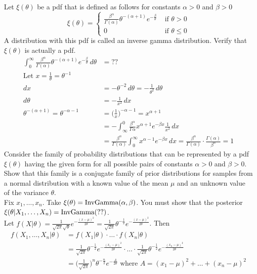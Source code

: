 \documentclass[12pt]{article}
\begin{document}
Let $\xi(\theta)$ be a pdf that is defined as follows for constants $\alpha > 0$ and $\beta > 0$ $$\xi(\theta) = \begin{cases} \frac{\beta^\alpha}{\Gamma(\alpha)} \theta^{-(\alpha + 1)} e^{-\frac{\beta}{\theta}} &\text{ if } \theta > 0 \\ 0 &\text{ if } \theta \leq 0 \end{cases} $$ A distribution with this pdf is called an inverse gamma distribution. Verify that $\xi(\theta)$ is actually a pdf. 
$$ \begin{aligned} \int_0^\infty \frac{\beta^\alpha}{\Gamma(\alpha)} \theta^{-(\alpha + 1)} e^{-\frac{\beta}{\theta}}\, d\theta &= ?? \\ \text{Let } x = \frac{1}{\theta} = \theta^{-1} \\ dx &= -\theta^{-2} \, d\theta = -\frac{1}{\theta^2} \, d\theta \\  d\theta &= -\frac{1}{x^2} \, dx \\ \theta^{-(\alpha + 1)} = \theta^{-\alpha - 1} &= \Big( \frac{1}{x} \Big)^{-\alpha - 1} = x^{\alpha + 1} \\ &= -\int_{\infty}^0 \frac{\beta^\alpha}{\Gamma{\alpha}} x^{\alpha + 1} e^{-\beta x} \frac{1}{x^2} \, dx \\ &= \frac{\beta^\alpha}{\Gamma(\alpha)} \int_0^\infty x^{\alpha - 1} e^{-\beta x} \, dx = \frac{\beta^\alpha}{\Gamma(\alpha)} \cdot \frac{\Gamma(\alpha)}{\beta^{\alpha}} = 1 \end{aligned} $$ 
Consider the family of probability distributions that can be represented by a pdf $\xi(\theta)$ having the given form for all possible pairs of constants $\alpha > 0$ and $\beta> 0$. Show that this family is a conjugate family of prior distributions for samples from a normal distribution with a known value of the mean $\mu$ and an unknown value of the variance $\theta$. \\ 
Fix $x_1,\dots,x_n$. Take $\xi(\theta) = \text{InvGamma}( \alpha,\beta )$. You must show that the posterior $\xi(\theta | X_1,\dots,X_n) = \text{InvGamma}( ?? )$. \\
Let $f(X|\theta) = \frac{1}{\sqrt{2\pi}\sqrt{\theta}} e^{-\frac{(x - \mu)^2}{2\theta}} = \frac{1}{\sqrt{2\pi}} \theta^{-\frac{1}{2}} e^{-\frac{(x-\mu)^2}{2\theta}}$. Then 
$$\begin{aligned} f(X_1,\dots,X_n|\theta) &= f(X_1|\theta) \cdot \dots \cdot f(X_n | \theta) \\ &=  \frac{1}{\sqrt{2\pi}} \theta^{-\frac{1}{2}} e^{-\frac{(x_1 - \mu)^2}{2\theta}} \cdot \dots \cdot \frac{1}{\sqrt{2\pi}} \theta^{-\frac{1}{2}} e^{-\frac{(x_n - \mu)^2}{2\theta}} \\ &= \Big( \frac{1}{\sqrt{2\pi}} \Big)^n \theta^{-\frac{n}{2}} e^{-\frac{A}{2\theta}} \text{ where } A = (x_1 - \mu)^2 + \dots + (x_n - \mu)^2 \end{aligned} $$ 
\end{document}
